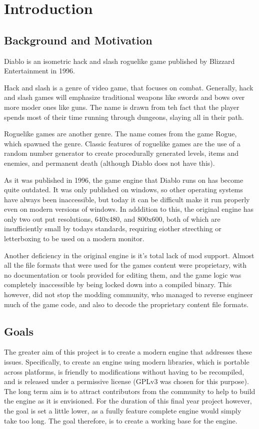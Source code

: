 \section{Introduction}
	\subsection{Background and Motivation}
	Diablo is an isometric hack and slash roguelike game published by Blizzard Entertainment in 1996\cite{diablo}.
	
	Hack and slash is a genre of video game, that focuses on combat. Generally, hack and slash games will emphasize   traditional weapons like swords and bows over more moder ones like guns. The name is drawn from teh fact that the player spends most of their time running through dungeons, slaying all in their path.
	
	Roguelike games are another genre. The name comes from the game Rogue\cite{rogue}, which spawned the genre.
	Classic features of roguelike games are the use of a random number generator to create procedurally generated levels, items and enemies, and permanent death (although Diablo does not have this).
	
	As it was published in 1996, the game engine that Diablo runs on has become quite outdated. It was only published on windows, so other operating systems have always been inaccessible, but today it can be difficult make it run properly even on modern versions of windows.
	In adddition to this, the original engine has only two out put resolutions, 640x480, and 800x600, both of which are insufficiently small by todays standards, requiring eiother strecthing or letterboxing to be used on a modern monitor.
	
	Another deficiency in the original engine is it's total lack of mod support. Almost all the file formats that were used for the games content were proprietary, with no documentation or tools provided for editing them, and the game logic was completely inaccessible by being locked down into a compiled binary. This however, did not stop the modding community, who managed to reverse engineer much of the game code, and also to decode the proprietary content file formats.

	\subsection{Goals}	
	The greater aim of this project is to create a modern engine that addresses these issues. Specifically, to create an engine using modern libraries, which is portable across platforms, is friendly to modifications without having to be recompiled, and is released under a permissive license (GPLv3 was chosen for this purpose).
	The long term aim is to attract contributors from the community to help to build the engine as it is envisioned. For the duration of this final year project however, the goal is set a little lower, as a fuully feature complete engine would simply take too long. The goal therefore, is to create a working base for the engine.
	
